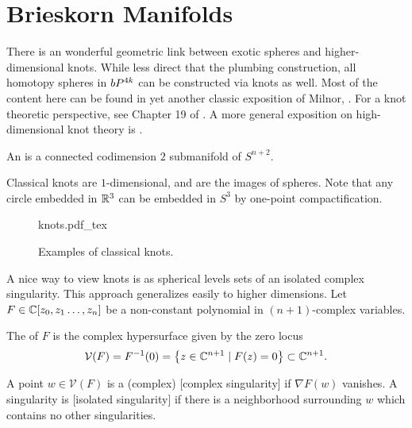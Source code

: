 \pagebreak
\newcommand{\V}{\mathcal{V}}
\renewcommand{\L}{\mathcal{L}}

\section{Brieskorn Manifolds}\label{sec:brieskorn}

There is an wonderful geometric link between exotic spheres and higher-dimensional knots. While less direct that the plumbing construction, all homotopy spheres in $bP^{4k}$ can be constructed via knots as well. Most of the content here can be found in yet another classic exposition of Milnor, \cite{milnor1968hypersurfaces}. For a knot theoretic perspective, see Chapter 19 of \cite{kauffman1987knots}. A more general exposition on high-dimensional knot theory is \cite{ranicki1998knot}.

\begin{definition}
  An  is a connected codimension $2$ submanifold of $S^{n+2}$.
\end{definition}

\begin{remark}
	Classical knots are $1$-dimensional, and are the images of spheres. Note that any circle embedded in $\mathbb{R}^3$ can be embedded in $S^3$ by one-point compactification.
\end{remark}

\begin{figure}[ht]
	\centering
	{knots.pdf_tex}
	\caption{Examples of classical knots.}
\end{figure}

A nice way to view knots is as spherical levels sets of an isolated complex singularity. This approach generalizes easily to higher dimensions. Let $F\in \mathbb{C}[z_0,z_1\ldots, z_n]$ be a non-constant polynomial in $(n+1)$-complex variables.
\begin{definition}
	The  of $F$ is the complex hypersurface given by the zero locus
	\[
		\V(F) = F^{-1}(0)=\left\{ z \in \C^{n+1} \mid F(z)=0\right\} \subset \C^{n+1}.
	\]
\end{definition}

\begin{definition}
	A point $w\in \V(F)$ is a (complex) [complex singularity] if $\nabla F(w)$ vanishes. A singularity is [isolated singularity] if there is a neighborhood surrounding $w$ which contains no other singularities.
\end{definition}

